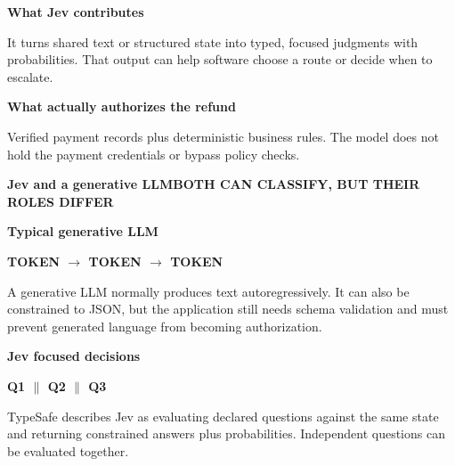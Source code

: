 \documentclass[10pt,a4paper,landscape]{article}
\newcommand{\pageheading}[2]{%
  {\Large\bfseries\color{Navy}#1}\hfill{\small\bfseries\color{Teal}#2}\par
  \vspace{1mm}{\color{Line}\rule{\textwidth}{0.7pt}}\vspace{3mm}
}
\begin{document}
\vspace{4mm}
\begin{minipage}[t]{0.49\textwidth}
\begin{tcolorbox}[border,colback=PaleTeal]
\textbf{What Jev contributes}\par
It turns shared text or structured state into typed, focused judgments with probabilities. That output can help software choose a route or decide when to escalate.
\end{tcolorbox}
\end{minipage}\hfill
\begin{minipage}[t]{0.49\textwidth}
\begin{tcolorbox}[border,colback=PaleGreen]
\textbf{What actually authorizes the refund}\par
Verified payment records plus deterministic business rules. The model does not hold the payment credentials or bypass policy checks.
\end{tcolorbox}
\end{minipage}

\newpage

\pageheading{Jev and a generative LLM}{BOTH CAN CLASSIFY, BUT THEIR ROLES DIFFER}

\begin{minipage}[t]{0.48\textwidth}
\begin{tcolorbox}[border,colback=PaleBlue]
{\Large\bfseries\color{Blue} Typical generative LLM}\par
\vspace{5mm}
\centering
{\LARGE\bfseries TOKEN $\rightarrow$ TOKEN $\rightarrow$ TOKEN}
\par\vspace{5mm}
\raggedright
A generative LLM normally produces text autoregressively. It can also be constrained to JSON, but the application still needs schema validation and must prevent generated language from becoming authorization.
\end{tcolorbox}
\end{minipage}\hfill
\begin{minipage}[t]{0.48\textwidth}
\begin{tcolorbox}[border,colback=PaleTeal]
{\Large\bfseries\color{Teal} Jev focused decisions}\par
\vspace{5mm}
\centering
{\LARGE\bfseries Q1 $\parallel$ Q2 $\parallel$ Q3}
\par\vspace{5mm}
\raggedright
TypeSafe describes Jev as evaluating declared questions against the same state and returning constrained answers plus probabilities. Independent questions can be evaluated together.
\end{tcolorbox}
\end{minipage}
\end{document}
